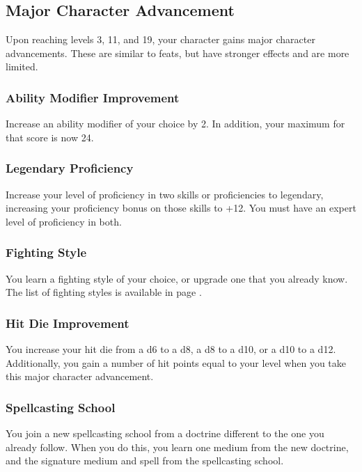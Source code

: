 \subsection*{Major Character Advancement} \label{ssec::majorcharacteradvancement}
Upon reaching levels 3, 11, and 19, your character gains major character advancements.
These are similar to feats, but have stronger effects and are more limited.

\subsubsection{Ability Modifier Improvement} \label{mca::abilitymodifierimprovement}
    Increase an ability modifier of your choice by 2.
    In addition, your maximum for that score is now 24.

\subsubsection{Legendary Proficiency} \label{mca::legendaryproficiency}
    Increase your level of proficiency in two skills or proficiencies to legendary, increasing your proficiency bonus on those skills to +12.
    You must have an expert level of proficiency in both.

\subsubsection{Fighting Style} \label{mca::fightingstyle}
    You learn a fighting style of your choice, or upgrade one that you already know.
    The list of fighting styles is available in page \pageref{ssec::fightingstyles}.

\subsubsection{Hit Die Improvement} \label{mca::hitdieimprovement}
    You increase your hit die from a d6 to a d8, a d8 to a d10, or a d10 to a d12.
    Additionally, you gain a number of hit points equal to your level when you take this major character advancement.

\subsubsection{Spellcasting School} \label{mca::spellcastingschool}
    You join a new spellcasting school from a doctrine different to the one you already follow.
    When you do this, you learn one medium from the new doctrine, and the signature medium and spell from the spellcasting school.

